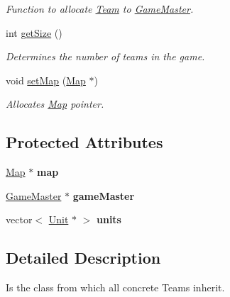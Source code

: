 \begin{DoxyCompactItemize}
\begin{DoxyCompactList}\small\item\em Function to allocate \hyperlink{class_team}{Team} to \hyperlink{class_game_master}{Game\+Master}. \end{DoxyCompactList}\item 
int \hyperlink{class_team_a8690d30ee7ef4bb392a785a4ad5c9c2e}{get\+Size} ()
\begin{DoxyCompactList}\small\item\em Determines the number of teams in the game. \end{DoxyCompactList}\item 
\hypertarget{class_team_a03768f721a08528bd0a71cf1e304f31c}{}void \hyperlink{class_team_a03768f721a08528bd0a71cf1e304f31c}{set\+Map} (\hyperlink{class_map}{Map} $\ast$)\label{class_team_a03768f721a08528bd0a71cf1e304f31c}

\begin{DoxyCompactList}\small\item\em Allocates \hyperlink{class_map}{Map} pointer. \end{DoxyCompactList}\end{DoxyCompactItemize}
\subsection*{Protected Attributes}
\begin{DoxyCompactItemize}
\item 
\hypertarget{class_team_a6bb143a18a36812a53732e41569d37c2}{}\hyperlink{class_map}{Map} $\ast$ {\bfseries map}\label{class_team_a6bb143a18a36812a53732e41569d37c2}

\item 
\hypertarget{class_team_a3e46f9986e378be9e3f7e546fcac0173}{}\hyperlink{class_game_master}{Game\+Master} $\ast$ {\bfseries game\+Master}\label{class_team_a3e46f9986e378be9e3f7e546fcac0173}

\item 
\hypertarget{class_team_ac3582d06395b1e07f91310b903680d41}{}vector$<$ \hyperlink{class_unit}{Unit} $\ast$ $>$ {\bfseries units}\label{class_team_ac3582d06395b1e07f91310b903680d41}

\end{DoxyCompactItemize}


\subsection{Detailed Description}
Is the class from which all concrete Teams inherit. 


